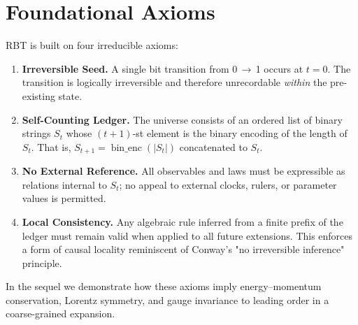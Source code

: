 \section{Foundational Axioms}
\label{sec:axioms}
RBT is built on four irreducible axioms:

\begin{enumerate}
  \item \textbf{Irreversible Seed.}  A single bit transition from 0\,$\to$\,1 occurs at $t=0$.  The transition is logically irreversible and therefore unrecordable \emph{within} the pre-existing state.
  \item \textbf{Self-Counting Ledger.}  The universe consists of an ordered list of binary strings $S_t$ whose $(t+1)$-st element is the binary encoding of the length of $S_t$.  That is, $S_{t+1} = \operatorname{bin\_enc}(|S_t|)$ concatenated to $S_t$.
  \item \textbf{No External Reference.}  All observables and laws must be expressible as relations internal to $S_t$; no appeal to external clocks, rulers, or parameter values is permitted.
  \item \textbf{Local Consistency.}  Any algebraic rule inferred from a finite prefix of the ledger must remain valid when applied to all future extensions.  This enforces a form of causal locality reminiscent of Conway's "no irreversible inference" principle.
\end{enumerate}

In the sequel we demonstrate how these axioms imply energy--momentum conservation, Lorentz symmetry, and gauge invariance to leading order in a coarse-grained expansion.
\clearpage 
